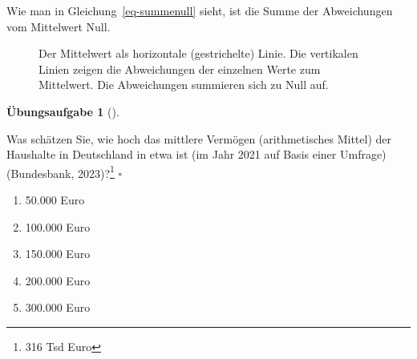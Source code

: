 \documentclass[
  letterpaper,
  twoside,
  open=any]{scrbook}
\providecommand{\tightlist}{%
  \setlength{\itemsep}{0pt}\setlength{\parskip}{0pt}}\usepackage{longtable,booktabs,array}
\theoremstyle{definition}
\theoremstyle{definition}
\newtheorem{exercise}{Übungsaufgabe}[chapter]
\theoremstyle{definition}
\theoremstyle{remark}
\begin{document}
Wie man in Gleichung~\ref{eq-summenull} sieht, ist die Summe der
Abweichungen vom Mittelwert Null.

\begin{figure}


\caption{\label{fig-mw1}Der Mittelwert als horizontale (gestrichelte)
Linie. Die vertikalen Linien zeigen die Abweichungen der einzelnen Werte
zum Mittelwert. Die Abweichungen summieren sich zu Null auf.}

\end{figure}%

\begin{exercise}[]\protect\hypertarget{exr-mw-wealth1}{}\label{exr-mw-wealth1}

Was schätzen Sie, wie hoch das mittlere Vermögen (arithmetisches Mittel)
der Haushalte in Deutschland in etwa ist (im Jahr 2021 auf Basis einer
Umfrage) (Bundesbank, 2023)?\footnote{316 Tsd Euro} \(\square\)

\begin{enumerate}
\def\labelenumi{\alph{enumi})}
\tightlist
\item
  50.000 Euro
\item
  100.000 Euro
\item
  150.000 Euro
\item
  200.000 Euro
\item
  300.000 Euro
\end{enumerate}

\end{exercise}
\end{document}

